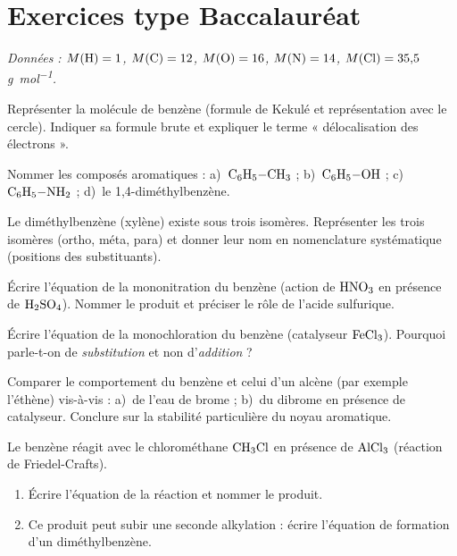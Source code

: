 \section{Exercices type Baccalauréat}
\textit{Données : $M(\ce{H})=1$, $M(\ce{C})=12$, $M(\ce{O})=16$, $M(\ce{N})=14$,
$M(\ce{Cl})=35{,}5$ \si{\gram\per\mol}.}


\exo{} Représenter la molécule de benzène (formule de Kekulé et
représentation avec le cercle). Indiquer sa formule brute et expliquer le terme
« délocalisation des électrons ».

\exo{} Nommer les composés aromatiques : a)~$\ce{C6H5-CH3}$ ;
b)~$\ce{C6H5-OH}$ ; c)~$\ce{C6H5-NH2}$ ; d)~le 1,4-diméthylbenzène.

\exo{} Le diméthylbenzène (xylène) existe sous trois isomères. Représenter
les trois isomères (ortho, méta, para) et donner leur nom en nomenclature
systématique (positions des substituants).


\exo{} Écrire l'équation de la mononitration du benzène (action de
$\ce{HNO3}$ en présence de $\ce{H2SO4}$). Nommer le produit et préciser le rôle de
l'acide sulfurique.

\exo{} Écrire l'équation de la monochloration du benzène (catalyseur
$\ce{FeCl3}$). Pourquoi parle-t-on de \emph{substitution} et non d'\emph{addition} ?

\exo{} Comparer le comportement du benzène et celui d'un alcène (par exemple
l'éthène) vis-à-vis : a)~de l'eau de brome ; b)~du dibrome en présence de catalyseur.
Conclure sur la stabilité particulière du noyau aromatique.

\exo{} Le benzène réagit avec le chlorométhane $\ce{CH3Cl}$ en présence de
$\ce{AlCl3}$ (réaction de Friedel-Crafts).
\begin{enumerate}[label=\arabic*)]
\item Écrire l'équation de la réaction et nommer le produit.
\item Ce produit peut subir une seconde alkylation : écrire l'équation de formation
d'un diméthylbenzène.
\end{enumerate}

